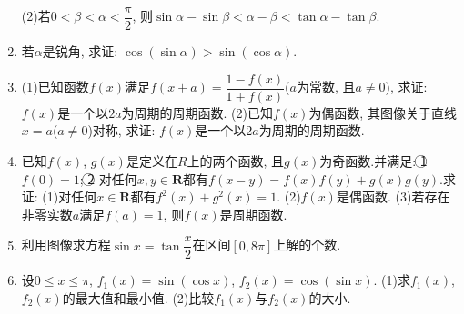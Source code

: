 \documentclass[10pt,a4paper]{article}
\begin{document}
\begin{enumerate}[1.]
(2)若$0<\beta <\alpha <\dfrac{\pi}2$, 则$\sin \alpha -\sin \beta <\alpha -\beta <\tan \alpha -\tan \beta$.
\item 若$\alpha$是锐角, 求证: $\cos (\sin \alpha)>\sin (\cos \alpha)$.
\item (1)已知函数$f(x)$满足$f(x+a)=\dfrac{1-f(x)}{1+f(x)}$($a$为常数, 且$a\ne 0$), 求证: $f(x)$是一个以$2a$为周期的周期函数.
(2)已知$f(x)$为偶函数, 其图像关于直线$x=a$($a\ne 0$)对称, 求证: $f(x)$是一个以$2a$为周期的周期函数.
\item 已知$f(x)$, $g(x)$是定义在$R$上的两个函数, 且$g(x)$为奇函数.并满足: \textcircled{1} $f(0)=1$; \textcircled{2} 对任何$x,y\in \mathbf{R}$都有$f(x-y)=f(x)f(y)+g(x)g(y)$.求证:
(1)对任何$x\in \mathbf{R}$都有$f^2(x)+g^2(x)=1$.
(2)$f(x)$是偶函数.
(3)若存在非零实数$a$满足$f(a)=1$, 则$f(x)$是周期函数.
\item 利用图像求方程$\sin x=\tan \dfrac x2$在区间$[0,8\pi]$上解的个数.
\item 设$0\le x\le \pi$, $f_1(x)=\sin (\cos x)$, $f_2(x)=\cos (\sin x)$.
(1)求$f_1(x)$, $f_2(x)$的最大值和最小值.
(2)比较$f_1(x)$与$f_2(x)$的大小.
    
\end{enumerate}
\end{document}
